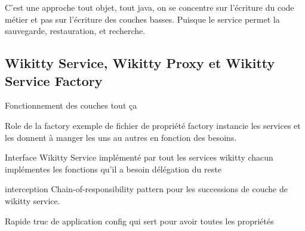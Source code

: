 C'est une approche tout objet, tout java, on se concentre sur l'écriture du code
métier et pas sur l'écriture des couches basses. Puisque le service permet la
sauvegarde, restauration, et recherche.

% 
% 


\subsection{Wikitty Service, Wikitty Proxy et Wikitty Service Factory}


Fonctionnement des couches 
tout ça

Role de la factory exemple de fichier de propriété 
factory instancie les services et les donnent à manger les uns au autres en
fonction des besoins.

Interface Wikitty Service implémenté par tout les services wikitty
chacun implémentes les fonctions qu'il a besoin
délégation du reste

interception Chain-of-responsibility pattern pour les successions de couche de
wikitty service. 


Rapide truc de application config qui sert pour avoir toutes les propriétés 

